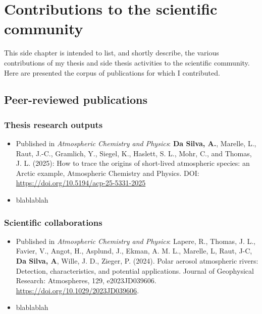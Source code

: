 \newpage
\thispagestyle{empty}
\mbox{}
\newpage


\chapter{Contributions to the scientific community}
\label{chap:contrib_commu}

This side chapter is intended to list, and shortly describe, the various contributions of my thesis and side thesis activities to the scientific community.
Here are presented the corpus of publications for which I contributed.

\section*{Peer-reviewed publications}
    \subsection*{Thesis research outputs}
    \begin{itemize}
        \item Published in \textit{Atmospheric Chemistry and Physics}:
            \textbf{Da Silva, A.}, Marelle, L., Raut, J.-C., Gramlich, Y., Siegel, K., Haslett, S. L., Mohr, C., and
Thomas, J. L. (2025): How to trace the origins of short-lived atmospheric species: an Arctic
            example, Atmospheric Chemistry and Physics. DOI: \url{https://doi.org/10.5194/acp-25-5331-2025}

        \item blablablah

    \end{itemize}
    \subsection*{Scientific collaborations}
    \begin{itemize}
        \item Published in \textit{Atmospheric Chemistry and Physics}:
        Lapere, R., Thomas, J. L., Favier, V., Angot, H., Asplund, J., Ekman, A. M. L., Marelle, L, Raut, J-C, \textbf{Da Silva, A}, Wille, J. D., Zieger, P. (2024). Polar aerosol atmospheric rivers: Detection, characteristics, and potential applications. Journal of  Geophysical Research: Atmospheres, 129, e2023JD039606. \url{https://doi.org/10.1029/2023JD039606}.

        \item blablablah 

    \end{itemize}

